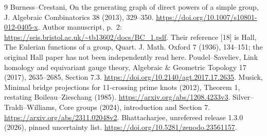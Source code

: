 \documentclass[11pt]{article}
\begin{document}
\begin{thebibliography}{9}
 Burness--Crestani, On the generating graph of direct powers
of a simple group, J. Algebraic Combinatorics 38 (2013), 329--350.
\url{https://doi.org/10.1007/s10801-012-0405-x}.
Author manuscript, p.~2:
\url{https://seis.bristol.ac.uk/~tb13602/docs/BC_1.pdf}.
Their reference [18] is Hall, The Eulerian functions of a group,
Quart. J. Math. Oxford 7 (1936), 134--151; the original Hall paper
has not been independently read here.
 Poudel--Saveliev, Link homology and equivariant gauge
theory, Algebraic \& Geometric Topology 17 (2017), 2635--2685,
Section 7.3. \url{https://doi.org/10.2140/agt.2017.17.2635}.
 Musick, Minimal bridge projections for 11-crossing
prime knots (2012), Theorem 1, restating Boileau--Zieschang (1985).
\url{https://arxiv.org/abs/1208.4233v3}.
 Silver--Traldi--Williams, Core groups (2024),
introduction and Section 7. \url{https://arxiv.org/abs/2311.02048v2}.
 Bhattacharjee, unrefereed release 1.3.0 (2026),
pinned uncertainty list. \url{https://doi.org/10.5281/zenodo.23561157}.
\end{thebibliography}
\end{document}
